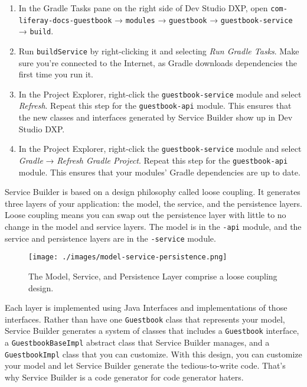 \begin{enumerate}
\def\labelenumi{\arabic{enumi}.}
\item
  In the Gradle Tasks pane on the right side of Dev Studio DXP, open
  \texttt{com-liferay-docs-guestbook} → \texttt{modules} →
  \texttt{guestbook} → \texttt{guestbook-service} → \texttt{build}.
\item
  Run \texttt{buildService} by right-clicking it and selecting \emph{Run
  Gradle Tasks}. Make sure you're connected to the Internet, as Gradle
  downloads dependencies the first time you run it.
\item
  In the Project Explorer, right-click the \texttt{guestbook-service}
  module and select \emph{Refresh}. Repeat this step for the
  \texttt{guestbook-api} module. This ensures that the new classes and
  interfaces generated by Service Builder show up in Dev Studio DXP.
\item
  In the Project Explorer, right-click the \texttt{guestbook-service}
  module and select \emph{Gradle} → \emph{Refresh Gradle Project}.
  Repeat this step for the \texttt{guestbook-api} module. This ensures
  that your modules' Gradle dependencies are up to date.
\end{enumerate}

Service Builder is based on a design philosophy called loose coupling.
It generates three layers of your application: the model, the service,
and the persistence layers. Loose coupling means you can swap out the
persistence layer with little to no change in the model and service
layers. The model is in the \texttt{-api} module, and the service and
persistence layers are in the \texttt{-service} module.

\begin{figure}
\centering
\texttt{[image: ./images/model-service-persistence.png]}
\caption{The Model, Service, and Persistence Layer comprise a loose
coupling design.}
\end{figure}

Each layer is implemented using Java Interfaces and implementations of
those interfaces. Rather than have one \texttt{Guestbook} class that
represents your model, Service Builder generates a system of classes
that includes a \texttt{Guestbook} interface, a
\texttt{GuestbookBaseImpl} abstract class that Service Builder manages,
and a \texttt{GuestbookImpl} class that you can customize. With this
design, you can customize your model and let Service Builder generate
the tedious-to-write code. That's why Service Builder is a code
generator for code generator haters.

